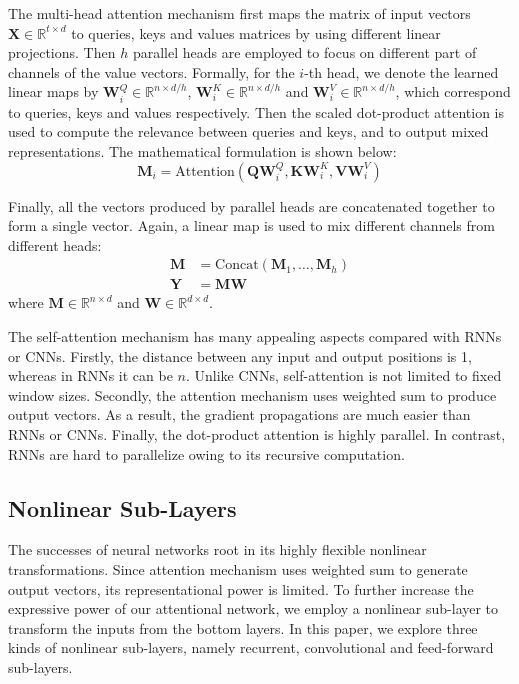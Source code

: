\documentclass[letterpaper]{article} \usepackage{aaai18}  \usepackage{times}  \usepackage{helvet}  \usepackage{courier}  \usepackage{url}  \usepackage{graphicx}  \frenchspacing  \setlength{\pdfpagewidth}{8.5in}  \setlength{\pdfpageheight}{11in}  \usepackage{latexsym}
\begin{document}
The multi-head attention mechanism first maps the matrix of input vectors $\mathbf{X} \in \mathbb{R}^{t \times d}$ to queries, keys and values matrices by using different linear projections. Then $h$ parallel heads are employed to focus on different part of channels of the value vectors. Formally, for the $i$-th head, we denote the learned linear maps by $\mathbf{W}_i^Q \in \mathbb{R}^{n \times d/h}$, $\mathbf{W}_i^K \in \mathbb{R}^{n \times d/h}$ and $\mathbf{W}_i^V \in \mathbb{R}^{n \times d/h}$, which correspond to queries, keys and values respectively. Then the scaled dot-product attention is used to compute the relevance between queries and keys, and to output mixed representations. The mathematical formulation is shown below:
\begin{equation}
\mathbf{M}_i = \textrm{Attention}(\mathbf{Q}\mathbf{W}_i^Q, \mathbf{K}\mathbf{W}_i^K, \mathbf{V}\mathbf{W}_i^V)
\end{equation}

Finally, all the vectors produced by parallel heads are concatenated together to form a single vector. Again, a linear map is used to mix different channels from different heads:
\begin{align}
\mathbf{M} &= \textrm{Concat}(\mathbf{M}_1, \ldots, \mathbf{M}_h) \\
\mathbf{Y} &= \mathbf{M}\mathbf{W}
\end{align}
where $\mathbf{M} \in \mathbb{R}^{n \times d}$ and $\mathbf{W} \in \mathbb{R}^{d \times d}$.

The self-attention mechanism has many appealing aspects compared with RNNs or CNNs. Firstly, the distance between any input and output positions is 1, whereas in RNNs it can be $n$. Unlike CNNs, self-attention is not limited to fixed window sizes. Secondly, the attention mechanism uses weighted sum to produce output vectors. As a result, the gradient propagations are much easier than RNNs or CNNs. Finally, the dot-product attention is highly parallel. In contrast, RNNs are hard to parallelize owing to its recursive computation.

\subsection{Nonlinear Sub-Layers}
The successes of neural networks root in its highly flexible nonlinear transformations. Since attention mechanism uses weighted sum to generate output vectors, its representational power is limited. To further increase the expressive power of our attentional network, we employ a nonlinear sub-layer to transform the inputs from the bottom layers. In this paper, we explore three kinds of nonlinear sub-layers, namely recurrent, convolutional and feed-forward sub-layers.
\end{document}
